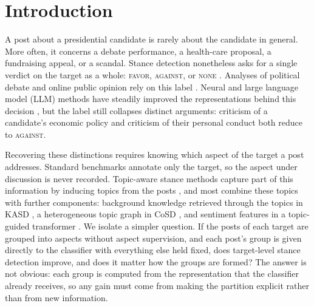 \documentclass[pdflatex,sn-mathphys-num,iicol]{sn-jnl}%
\begin{document}
\section{Introduction}\label{sec1}

A post about a presidential candidate is rarely about the candidate in general. More often, it concerns a debate performance, a health-care proposal, a fundraising appeal, or a scandal. Stance detection nonetheless asks for a single verdict on the target as a whole: \textsc{favor}, \textsc{against}, or \textsc{none} \cite{alturayeif2023systematic,kucuk2020stance}. Analyses of political debate and online public opinion rely on this label \cite{burnham2025stance,cao2022stance,aldayel2021stance}. Neural and large language model (LLM) methods have steadily improved the representations behind this decision \cite{gera2025deep}, but the label still collapses distinct arguments: criticism of a candidate's economic policy and criticism of their personal conduct both reduce to \textsc{against}.

Recovering these distinctions requires knowing which aspect of the target a post addresses. Standard benchmarks annotate only the target, so the aspect under discussion is never recorded. Topic-aware stance methods capture part of this information by inducing topics from the posts \cite{gomez2023stance,li2023stance,cheng2024cosd,muthusami2025interpretable}, and most combine these topics with further components: background knowledge retrieved through the topics in KASD \cite{li2023stance}, a heterogeneous topic graph in CoSD \cite{cheng2024cosd}, and sentiment features in a topic-guided transformer \cite{muthusami2025interpretable}. We isolate a simpler question. If the posts of each target are grouped into aspects without aspect supervision, and each post's group is given directly to the classifier with everything else held fixed, does target-level stance detection improve, and does it matter how the groups are formed? The answer is not obvious: each group is computed from the representation that the classifier already receives, so any gain must come from making the partition explicit rather than from new information.
\end{document}
